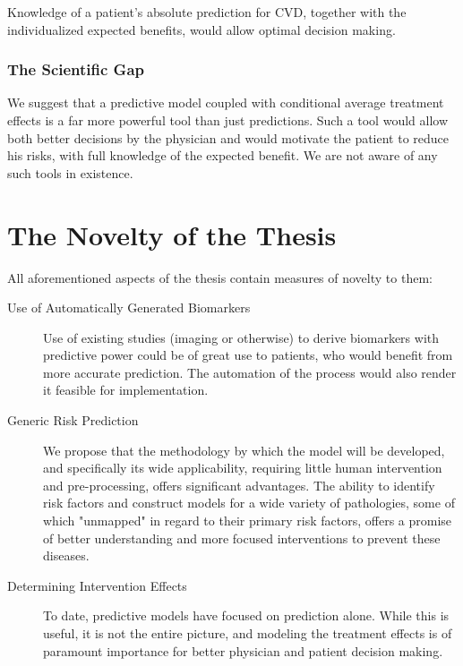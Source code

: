 \documentclass[a4paper,12pt]{article}
\begin{document}
			Knowledge of a patient's absolute prediction for CVD, together with the individualized expected benefits, would allow optimal decision making.
			
			\subsubsection{The Scientific Gap}
			
			We suggest that a predictive model coupled with conditional average treatment effects is a far more powerful tool than just predictions. Such a tool would allow both better decisions by the physician and would motivate the patient to reduce his risks, with full knowledge of the expected benefit. We are not aware of any such tools in existence.
			
	\section{The Novelty of the Thesis}
	
	All aforementioned aspects of the thesis contain measures of novelty to them:
	
	\begin{description}
		
		\item[Use of Automatically Generated Biomarkers] Use of existing studies (imaging or otherwise) to derive biomarkers with predictive power could be of great use to patients, who would benefit from more accurate prediction. The automation of the process would also render it feasible for implementation.
		
		\item[Generic Risk Prediction] We propose that the methodology by which the model will be developed, and specifically its wide applicability, requiring little human intervention and pre-processing, offers significant advantages. The ability to identify risk factors and construct models for a wide variety of pathologies, some of which "unmapped" in regard to their primary risk factors, offers a promise of better understanding and more focused interventions to prevent these diseases.
		
		\item[Determining Intervention Effects] To date, predictive models have focused on prediction alone. While this is useful, it is not the entire picture, and modeling the treatment effects is of paramount importance for better physician and patient decision making.
		
	\end{description}
	
\end{document}
